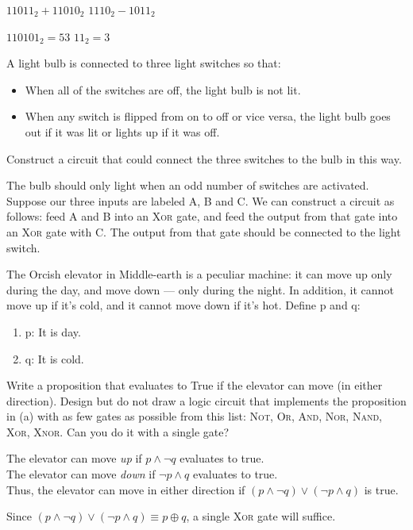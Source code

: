 \documentclass[solution, letterpaper]{cs20inclass}
\begin{document}
\subproblem $11011_2 + 11010_2$
\subproblem $1110_2 - 1011_2$

\begin{solution}
\subsolution $110101_2 = 53$
\subsolution $11_2 = 3$
\end{solution}


\problem
A light bulb is connected to three light switches so that:
  \begin{itemize}
    \item When all of the switches are off, the light bulb is not lit.
    \item When any switch is flipped from on to off or vice versa, the light bulb goes out if it was lit or lights up if it was off.
  \end{itemize}
Construct a circuit that could connect the three switches to the bulb in this way.

\begin{solution}

The bulb should only light when an odd number of switches are activated. Suppose our three inputs are labeled A, B and C. We can construct a circuit as follows: feed A and B into an \textsc{Xor} gate, and feed the output from that gate into an \textsc{Xor} gate with C. The output from that gate should be connected to the light switch.
\end{solution}

\problem The Orcish elevator in Middle-earth is a peculiar machine: it can move up only during the day, and move down --- only during the night. In addition, it cannot move up if it's cold, and it cannot move down if it's hot. Define p and q:

\begin{enumerate}
\item p: It is day.
\item q: It is cold.
\end{enumerate}

\subproblem Write a proposition that evaluates to True if the elevator can move (in either direction).  
\subproblem Design but do not draw a logic circuit that implements the proposition in (a) with as few gates as possible from this list: \textsc{Not}, \textsc{Or}, \textsc{And}, \textsc{Nor}, \textsc{Nand}, \textsc{Xor}, \textsc{Xnor}. Can you do it with a single gate?

\begin{solution}
\subsolution
    The elevator can move \emph{up} if $p \land \lnot q$ evaluates to true. \\
    The elevator can move \emph{down} if $\lnot p \land q$ evaluates to true. \\
    Thus, the elevator can move in either direction if $(p \land \lnot q) \lor (\lnot p \land q)$ is true.
    
\subsolution Since $(p \land \lnot q) \lor (\lnot p \land q) \equiv p \oplus q$, a single \textsc{Xor} gate will suffice.

\end{solution}
\end{document}
